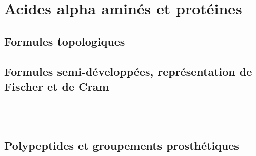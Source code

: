 \section{Acides alpha aminés et protéines}

\subsection{Formules topologiques}

\begin{boiteCodeTex}{}
  \chemfig{!\arginine}
  \chemfig{!\histidine}
  \chemfig{!\lysine}
  \chemfig{!\aspartique}
\end{boiteCodeTex}
  
\begin{boiteCodeTex}{}
  \chemfig{!\glutamique}
  \chemfig{!\serine}
  \chemfig{!\threonine}
  \chemfig{!\asparagine}
\end{boiteCodeTex}
  
\begin{boiteCodeTex}{}
  \chemfig{!\glutamine}
  \chemfig{!\cysteine}
  \chemfig{!\selenocysteine}
  \chemfig{!\glycine}
\end{boiteCodeTex}
  
\begin{boiteCodeTex}{}
  \chemfig{!\proline}
  \chemfig{!\alanine}
  \chemfig{!\valine}
  \chemfig{!\isoleucine}
  \chemfig{!\leucine}
\end{boiteCodeTex}
  
\begin{boiteCodeTex}{}
  \chemfig{!\methionine}
  \chemfig{!\phenylalanine}
  \chemfig{!\tyrosine}
  \chemfig{!\tryptophane}
\end{boiteCodeTex}

\subsection{Formules semi-développées, représentation de Fischer et de Cram}

\begin{boiteCodeTex}{}
  \chemfig{!\alanineSemiDev} \qq{}
  \chemfig{!\asparagineSemiDev} \qq{}
  \chemfig{!\glycineSemiDev} \\[8pt]
  \chemfig{!\cysteineSemiDev} \\[8pt]
\end{boiteCodeTex}

\begin{boiteCodeTex}{}
  \chemfig{!\alanineL} \quad
  \chemfig{!\alanineD} \quad
  \chemfig{!\valineL} \quad
  \chemfig{!\valineD}
\end{boiteCodeTex}

\subsection{Polypeptides et groupements prosthétiques}

\begin{boiteCodeTex}{}
\end{boiteCodeTex}

\begin{boiteCodeTex}{}
  \chemfig[atom sep = 18pt]{!\hemeB}
\end{boiteCodeTex}
